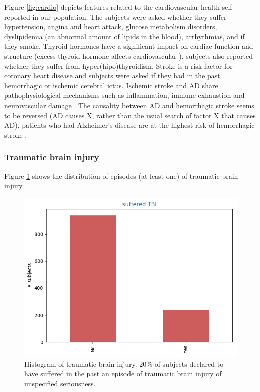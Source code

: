 \documentclass[11pt]{article}
\theoremstyle{definition}
\theoremstyle{remark}
\begin{document}
Figure \ref{fig:cardio} depicts features related to the cardiovascular health self reported in our population. The subjects were asked whether they suffer hypertension, angina and heart attack, glucose metabolism disorders, dyslipidemia (an abnormal amount of lipids in the blood), arrhythmias, and if they smoke. 
Thyroid hormones have a significant impact on cardiac function and structure (excess thyroid hormone affects cardiovascular \cite{klein2007thyroid}), subjects also reported whether they suffer from hyper(hipo)thyroidism.
Stroke is a risk factor for coronary heart disease and subjects were asked if they had in the past hemorrhagic or ischemic cerebral ictus. Ischemic stroke and AD share pathophysiological mechanisms such as inflammation, immune exhaustion and neurovascular damage \cite{lucke2015common}. 
The causality between AD and hemorrhagic stroke seems to be reversed (AD causes X, rather than the usual search of factor X that causes AD), patients who had Alzheimer's disease are at the highest risk of hemorrhagic stroke \cite{wang2014newly}.

\subsubsection{Traumatic brain injury}
\label{ssse:tbe}
Figure \ref{fig:tce} shows the distribution of episodes (at least one) of traumatic brain injury. 
\begin{figure}[H]
        \centering
        \includegraphics[keepaspectratio, width=0.6\linewidth]{figures/Fig_tce}
        \caption{Histogram of traumatic brain injury. $20\%$ of subjects declared to have suffered in the past an episode of traumatic brain injury of unspecified seriousness.} 
        \label{fig:tce}
\end{figure}
\end{document}
